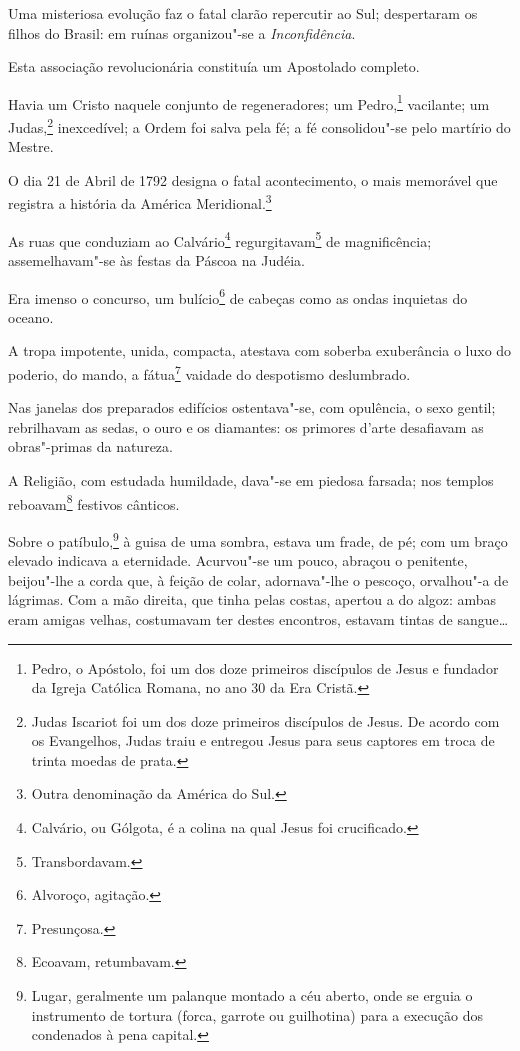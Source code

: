 Uma misteriosa evolução faz o fatal clarão repercutir ao Sul;
despertaram os filhos do Brasil: em ruínas organizou"-se a
\emph{Inconfidência}.

Esta associação revolucionária constituía um Apostolado completo.

Havia um Cristo naquele conjunto de regeneradores; um Pedro,\footnote{
  Pedro, o Apóstolo, foi um dos doze primeiros discípulos de Jesus e
  fundador da Igreja Católica Romana, no ano 30 da Era Cristã.}
vacilante; um Judas,\footnote{Judas Iscariot foi um dos doze primeiros
  discípulos de Jesus. De acordo com os Evangelhos, Judas traiu e
  entregou Jesus para seus captores em troca de trinta moedas de prata.}
inexcedível; a Ordem foi salva pela fé; a fé consolidou"-se pelo martírio
do Mestre.

O dia 21 de Abril de 1792 designa o fatal acontecimento, o mais
memorável que registra a história da América Meridional.\footnote{
  Outra denominação da América do Sul.}

As ruas que conduziam ao Calvário\footnote{Calvário, ou Gólgota, é a
  colina na qual Jesus foi crucificado.} regurgitavam\footnote{
  Transbordavam.} de magnificência; assemelhavam"-se às festas da Páscoa
na Judéia.

Era imenso o concurso, um bulício\footnote{Alvoroço, agitação.} de
cabeças como as ondas inquietas do oceano.

A tropa impotente, unida, compacta, atestava com soberba exuberância o
luxo do poderio, do mando, a fátua\footnote{Presunçosa.} vaidade do
despotismo deslumbrado.

Nas janelas dos preparados edifícios ostentava"-se, com opulência, o sexo
gentil; rebrilhavam as sedas, o ouro e os diamantes: os primores d'arte
desafiavam as obras"-primas da natureza.

A Religião, com estudada humildade, dava"-se em piedosa farsada; nos
templos reboavam\footnote{Ecoavam, retumbavam.} festivos cânticos.

Sobre o patíbulo,\footnote{Lugar, geralmente um palanque montado a céu
  aberto, onde se erguia o instrumento de tortura (forca, garrote ou
  guilhotina) para a execução dos condenados à pena capital.} à guisa
de uma sombra, estava um frade, de pé; com um braço elevado indicava a
eternidade. Acurvou"-se um pouco, abraçou o penitente, beijou"-lhe a corda
que, à feição de colar, adornava"-lhe o pescoço, orvalhou"-a de lágrimas.
Com a mão direita, que tinha pelas costas, apertou a do algoz: ambas
eram amigas velhas, costumavam ter destes encontros, estavam tintas de
sangue\ldots{}

